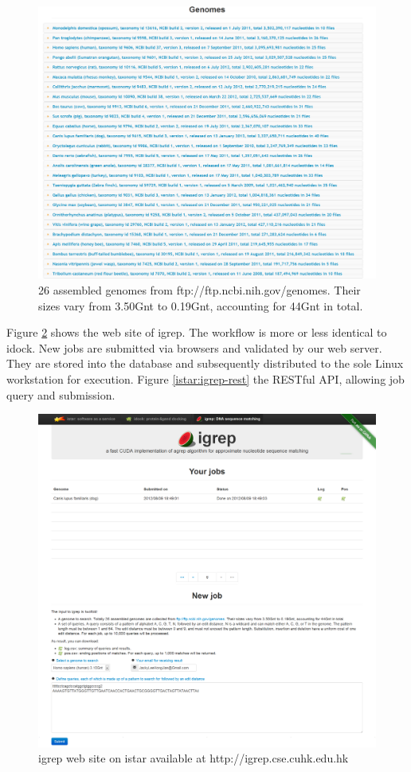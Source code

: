 \begin{figure}
\centering
\includegraphics[width=\linewidth]{istar/Genomes.png}
\caption{26 assembled genomes from ftp://ftp.ncbi.nih.gov/genomes. Their sizes vary from 3.50Gnt to 0.19Gnt, accounting for 44Gnt in total.}
\label{istar:Genomes}
\end{figure}

Figure \ref{istar:igrep} shows the web site of igrep. The workflow is more or less identical to idock. New jobs are submitted via browsers and validated by our web server. They are stored into the database and subsequently distributed to the sole Linux workstation for execution. Figure \ref{istar:igrep-rest} the RESTful API, allowing job query and submission.

\begin{figure}
\centering
\includegraphics[width=\linewidth]{istar/igrep.png}
\caption{igrep web site on istar available at http://igrep.cse.cuhk.edu.hk}
\label{istar:igrep}
\end{figure}

